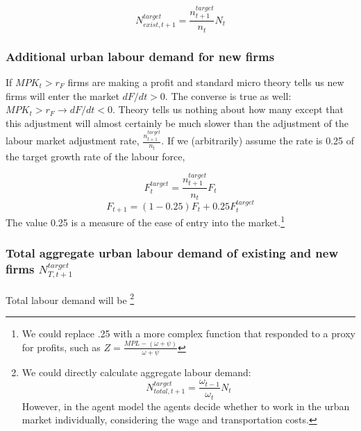 \begin{equation}N_{exist,t+1}^{target} = \frac{n^{target}_{t+1}}{n_{t}} N_t\end{equation}   


\subsubsection{Additional urban labour demand for new firms}
If  $MPK_t > r_F$  firms are making a profit and standard micro theory tells us new firms will enter the market $dF/dt >0$. The converse is true as well: $MPK_t > r_F \rightarrow dF/dt <0$. Theory tells us nothing about how many except that this adjustment will almost certainly be much slower than the adjustment of the labour market adjustment rate, $\frac{n^{target}_{t+1}}{n_{t}}$. If we (arbitrarily) assume the rate is 0.25  of the target growth rate of the labour force,

 \begin{equation}
F_t^{target}= \frac{n^{target}_{t+1}}{n_{t}}F_t
\end{equation} 
\begin{equation}
F_{t+1}= (1-0.25)F_t + 0.25F_t^{target}
\end{equation} 
The value 0.25 is a measure of the ease of entry into the market.\footnote{We could replace .25 with a more complex function that responded to a proxy for profits, such as $Z=\frac{MPL-(\omega+\psi)}{\omega+\psi}$}

\subsubsection{Total aggregate urban labour demand of existing and new firms $N_{T,t+1}^{target}$} 
Total labour demand will be
\footnote{We could  directly calculate aggregate labour demand:
\begin{equation}
  N_{total,t+1}^{target}= 
  \frac {\omega_{t-1}} {\omega_{t}} N_t \nonumber
\end{equation}
However, in the agent model the agents decide whether to work in the urban market individually, considering the wage and transportation costs.
}

